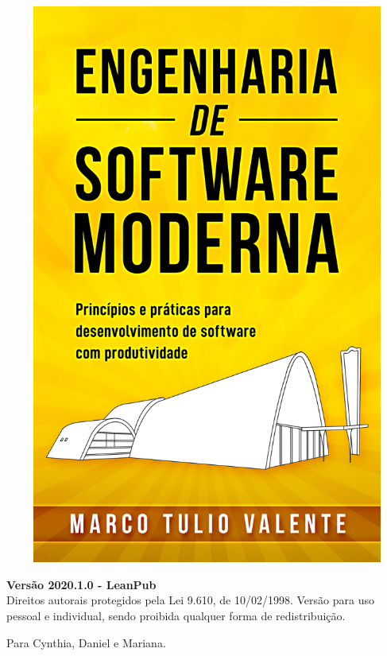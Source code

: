 \thispagestyle{empty}

\begin{titlepage}
\begin{center}
\includegraphics[width=15cm, height=18.5cm]{figs/capa/capa.jpg}
\end{center}
\end{titlepage}

\newpage
\thispagestyle{empty}
\vspace*{5cm}
\begin{center}
{\Large \bf  Versão 2020.1.0 - LeanPub}\\ 
\vspace*{1cm}
{\large Direitos autorais protegidos pela Lei 9.610, de 10/02/1998. Versão para  uso pessoal e individual, sendo proibida qualquer forma de redistribuição.}
\end{center}
\newpage

\newpage
\thispagestyle{empty}
\vspace*{5cm}
\begin{center}
\large Para Cynthia, Daniel e Mariana.
\end{center}
\newpage

\tableofcontents
